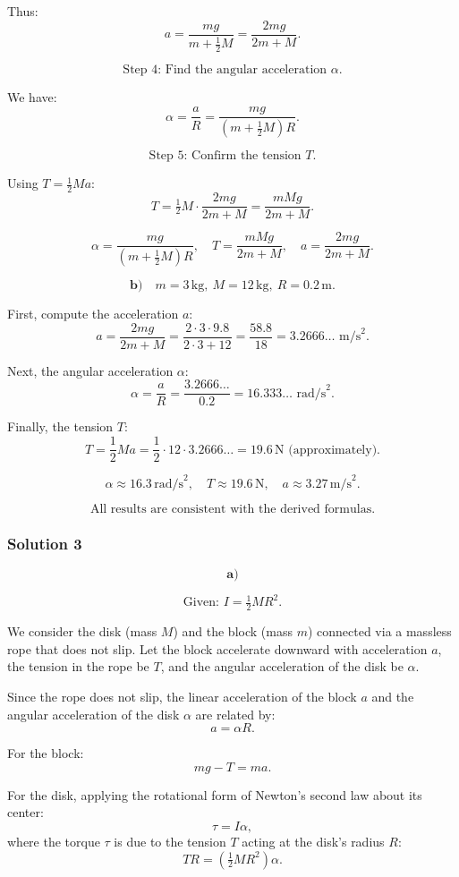 \documentclass{article}
\begin{document}
Thus:
\[
a = \frac{mg}{m + \tfrac{1}{2} M} = \frac{2mg}{2m + M}.
\]

\[
\text{Step 4: Find the angular acceleration } \alpha.
\]

We have:
\[
\alpha = \frac{a}{R} = \frac{m g}{(m + \tfrac{1}{2} M) R}.
\]

\[
\text{Step 5: Confirm the tension } T.
\]

Using \(T = \tfrac{1}{2} M a\):
\[
T = \tfrac{1}{2}M \cdot \frac{2mg}{2m + M} = \frac{mM g}{2m + M}.
\]

\[
\boxed{\alpha = \frac{mg}{(m+\tfrac{1}{2} M)R}, \quad T = \frac{mM g}{2m + M}, \quad a = \frac{2mg}{2m + M}.}
\]

\[
\textbf{b)} \quad m = 3\,\text{kg}, \ M = 12\,\text{kg}, \ R = 0.2\,\text{m}.
\]

First, compute the acceleration \(a\):
\[
a = \frac{2 m g}{2 m + M} = \frac{2 \cdot 3 \cdot 9.8}{2 \cdot 3 + 12} = \frac{58.8}{18} = 3.2666\ldots \text{ m/s}^2.
\]

Next, the angular acceleration \(\alpha\):
\[
\alpha = \frac{a}{R} = \frac{3.2666\ldots}{0.2} = 16.333\ldots \text{ rad/s}^2.
\]

Finally, the tension \(T\):
\[
T = \frac{1}{2} M a = \frac{1}{2} \cdot 12 \cdot 3.2666\ldots = 19.6\,\text{N (approximately)}.
\]

\[
\boxed{\alpha \approx 16.3\,\text{rad/s}^2, \quad T \approx 19.6\,\text{N}, \quad a \approx 3.27\,\text{m/s}^2.}
\]

\[
\text{All results are consistent with the derived formulas.}
\]

\subsubsection{Solution 3}
\[
\textbf{a)} 
\]

\[
\text{Given: } I = \tfrac{1}{2} M R^{2}.
\]

We consider the disk (mass $M$) and the block (mass $m$) connected via a massless rope that does not slip. Let the block accelerate downward with acceleration $a$, the tension in the rope be $T$, and the angular acceleration of the disk be $\alpha$.

Since the rope does not slip, the linear acceleration of the block $a$ and the angular acceleration of the disk $\alpha$ are related by:
\[
a = \alpha R.
\]

For the block:
\[
m g - T = m a.
\]

For the disk, applying the rotational form of Newton's second law about its center:
\[
\tau = I \alpha,
\]
where the torque $\tau$ is due to the tension $T$ acting at the disk's radius $R$:
\[
T R = \left(\tfrac{1}{2} M R^{2}\right) \alpha.
\]
\end{document}
